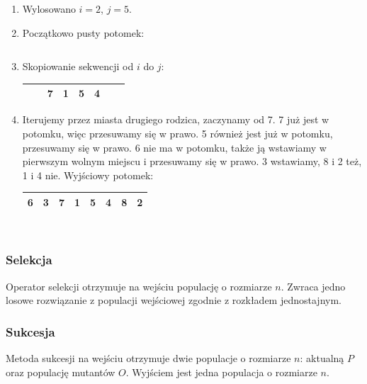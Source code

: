 \documentclass[12pt, a4paper]{article}
\begin{document}
\begin{enumerate}
 \item Wylosowano $i = 2$, $j = 5$.

 \item Początkowo pusty potomek:
\begin{tabular}{ | c | c | c | c | c | c | c | c |}
 \hline
   &  &  &  &  &  &  &  \\ \hline
\end{tabular}

 \item Skopiowanie sekwencji od $i$ do $j$:
\begin{tabular}{ | c | c | c | c | c | c | c | c |}
 \hline
   &  &  \cellcolor{green!25}7 & \cellcolor{green!25}1 & \cellcolor{green!25}5 & \cellcolor{green!25}4 &  &  \\ \hline
\end{tabular}

 \item Iterujemy przez miasta drugiego rodzica, zaczynamy od 7. 7 już jest w potomku, więc przesuwamy się w prawo.
5 również jest już w potomku, przesuwamy się w prawo. 6 nie ma w potomku, także ją wstawiamy w pierwszym wolnym miejscu
i przesuwamy się w prawo. 3 wstawiamy, 8 i 2 też, 1 i 4 nie. Wyjściowy potomek:

\begin{tabular}{ | c | c | c | c | c | c | c | c |}
 \hline
  6 & 3 &  \cellcolor{green!25}7 & \cellcolor{green!25}1 & \cellcolor{green!25}5 & \cellcolor{green!25}4 & 8 & 2 \\ \hline
\end{tabular}\\

\end{enumerate}

\subsubsection{Selekcja}

Operator selekcji otrzymuje na wejściu populację o rozmiarze $n$. Zwraca jedno losowe rozwiązanie z populacji wejściowej
zgodnie z rozkładem jednostajnym.

\subsubsection{Sukcesja}

Metoda sukcesji na wejściu otrzymuje dwie populacje o rozmiarze $n$: aktualną $P$ oraz populację mutantów $O$.
Wyjściem jest jedna populacja o rozmiarze $n$.
\end{document}

